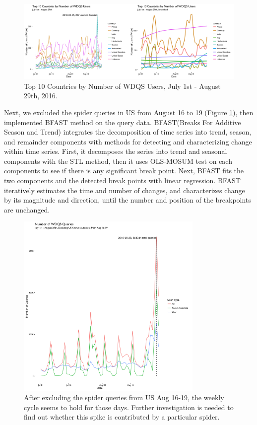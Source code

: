 \documentclass[12pt,]{article}
\begin{document}
\begin{figure}[H]
\centering
\includegraphics{figures/user_country_ts.png}
\caption{Top 10 Countries by Number of WDQS Users, July 1st - August
29th, 2016.}
\end{figure}

Next, we excluded the spider queries in US from August 16 to 19 (Figure
\ref{eclus}), then implemented BFAST method on the query data.
BFAST(Breaks For Additive Season and Trend) integrates the decomposition
of time series into trend, season, and remainder components with methods
for detecting and characterizing change within time series. First, it
decomposes the series into trend and seasonal components with the STL
method, then it uses OLS-MOSUM test on each components to see if there
is any significant break point. Next, BFAST fits the two components and
the detected break points with linear regression. BFAST iteratively
estimates the time and number of changes, and characterizes change by
its magnitude and direction, until the number and position of the
breakpoints are unchanged.

\begin{figure}[H]
\centering
\includegraphics[width=9cm,height=9cm,keepaspectratio]{figures/all_query_ecl_us_spider0816_ts.png}
\caption{After excluding the spider queries from US Aug 16-19, the
weekly cycle seems to hold for those days. Further investigation is
needed to find out whether this spike is contributed by a particular
spider.\label{eclus}}
\end{figure}
\end{document}
